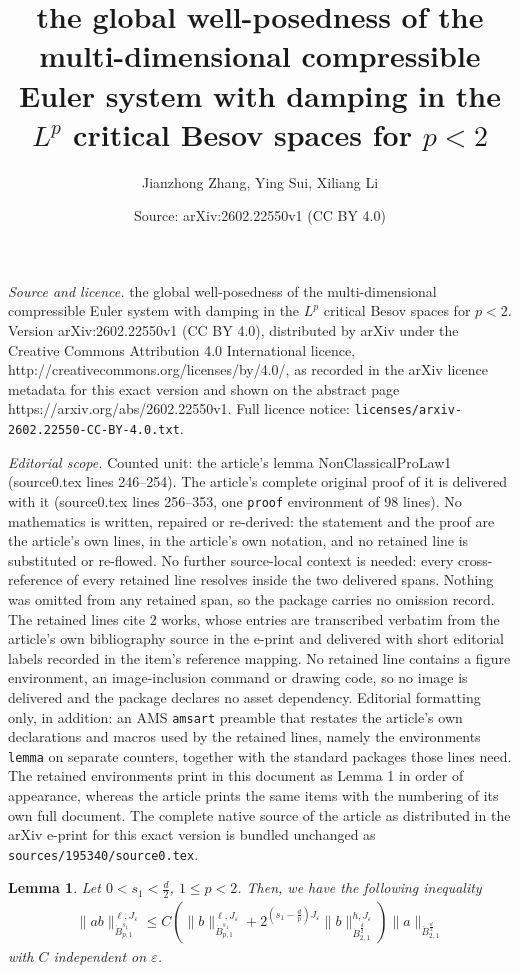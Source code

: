 \documentclass[10pt,a4paper]{amsart}
\title{the global well-posedness of the multi-dimensional compressible Euler system with damping in the $L^p$ critical Besov spaces for $p<2$}
\author{Jianzhong Zhang, Ying Sui, Xiliang Li}
\date{Source: arXiv:2602.22550v1 (CC BY 4.0)}
\newtheorem{lemma}{Lemma}
\def\dB{{\dot {B}}}
\begin{document}
\maketitle

\noindent\emph{Source and licence.} the global well-posedness of the multi-dimensional compressible Euler system with damping in the $L^p$ critical Besov spaces for $p<2$. Version arXiv:2602.22550v1 (CC BY 4.0), distributed by arXiv under the Creative Commons Attribution 4.0 International licence, http://creativecommons.org/licenses/by/4.0/, as recorded in the arXiv licence metadata for this exact version and shown on the abstract page https://arxiv.org/abs/2602.22550v1. Full licence notice: \texttt{licenses/arxiv-2602.22550-CC-BY-4.0.txt}.\par\smallskip

\noindent\textit{Editorial scope.} Counted unit: the article's lemma NonClassicalProLaw1 (source0.tex lines 246--254). The article's complete original proof of it is delivered with it (source0.tex lines 256--353, one \texttt{proof} environment of 98 lines). No mathematics is written, repaired or re-derived: the statement and the proof are the article's own lines, in the article's own notation, and no retained line is substituted or re-flowed.  No further source-local context is needed: every cross-reference of every retained line resolves inside the two delivered spans.  Nothing was omitted from any retained span, so the package carries no omission record.  The retained lines cite 2 works, whose entries are transcribed verbatim from the article's own bibliography source in the e-print and delivered with short editorial labels recorded in the item's reference mapping.  No retained line contains a figure environment, an image-inclusion command or drawing code, so no image is delivered and the package declares no asset dependency.  Editorial formatting only, in addition: an AMS \texttt{amsart} preamble that restates the article's own declarations and macros used by the retained lines, namely the environments \texttt{lemma} on separate counters, together with the standard packages those lines need.  The retained environments print in this document as Lemma 1 in order of appearance, whereas the article prints the same items with the numbering of its own full document.  The complete native source of the article as distributed in the arXiv e-print for this exact version is bundled unchanged as \texttt{sources/195340/source0.tex}.
\begin{lemma}\label{NonClassicalProLaw1}
Let $0<s_1<\frac{d}{2}$, $1\leq p<2$. Then, we have the following inequality
\begin{align}\label{newproduct}
\|ab\|_{\dB_{p,1}^{s_1}}^{\ell,J_\varepsilon}
\leq C
\left(\|b\|_{\dB_{p,1}^{s_1}}^{\ell,J_\varepsilon}+ 2^{(s_1-\frac{d}{p})J_\varepsilon}\|b\|_{\dB_{2,1}^{\frac{d}{2}}}^{h,J_\varepsilon} \right)\|a\|_{\dB_{2,1}^{\frac{d}{2}}}
\end{align}
with $C$ independent on $\varepsilon$.
\end{lemma}
\end{document}
